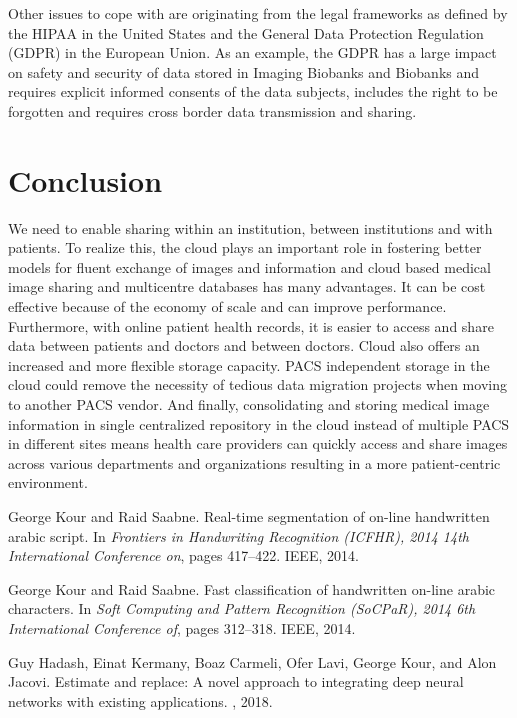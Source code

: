 Other issues to cope with are originating from the legal frameworks as defined by the HIPAA in the United States and the General Data Protection Regulation (GDPR) in the European Union. As an example, the GDPR has a large impact on safety and security of data stored in Imaging Biobanks and Biobanks and requires explicit informed consents of the data subjects, includes the right to be forgotten and requires cross border data transmission and sharing. 
\section{Conclusion}
We need to enable sharing within an institution, between institutions and with patients. To realize this, the cloud plays an important role in fostering better models for fluent exchange of images and information and cloud based medical image sharing and multicentre databases has many advantages. It can be cost effective because of the economy of scale and can improve performance. Furthermore, with online patient health records, it is easier to access and share data between patients and doctors and between doctors. Cloud also offers an increased and more flexible storage capacity. PACS independent storage in the cloud could remove the necessity of tedious data migration projects when moving to another PACS vendor. And finally, consolidating and storing medical image information in single centralized repository in the cloud instead of multiple PACS in different sites means health care providers can quickly access and share images across various departments and organizations resulting in a more patient-centric environment.
\begin{thebibliography}{1}

	George Kour and Raid Saabne.
	\newblock Real-time segmentation of on-line handwritten arabic script.
	\newblock In {\em Frontiers in Handwriting Recognition (ICFHR), 2014 14th
			International Conference on}, pages 417--422. IEEE, 2014.

	George Kour and Raid Saabne.
	\newblock Fast classification of handwritten on-line arabic characters.
	\newblock In {\em Soft Computing and Pattern Recognition (SoCPaR), 2014 6th
			International Conference of}, pages 312--318. IEEE, 2014.

	Guy Hadash, Einat Kermany, Boaz Carmeli, Ofer Lavi, George Kour, and Alon
	Jacovi.
	\newblock Estimate and replace: A novel approach to integrating deep neural
	networks with existing applications.
	, 2018.

\end{thebibliography}

